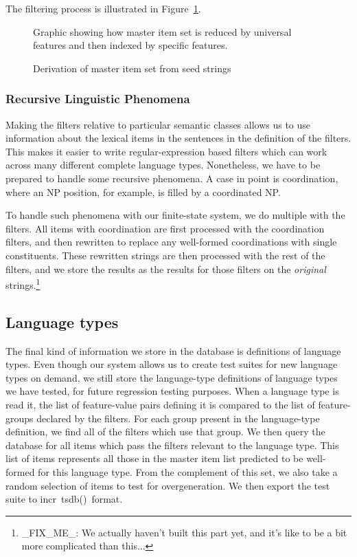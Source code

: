 \documentclass[11pt]{article}
\newcommand{\itsdb}{\mbox{\sf \lbrack incr tsdb()\rbrack}}
\begin{document}
The filtering process is illustrated in Figure~\ref{shrinking-sets}.

\begin{figure}[ht]
\begin{center}

Graphic showing how master item set is reduced by universal features
and then indexed by specific features.

\end{center}
\caption{Derivation of master item set from seed strings}
\label{shrinking-sets}
\end{figure}


\subsubsection{Recursive Linguistic Phenomena}

Making the filters relative to particular semantic classes
allows us to use information about the lexical items in 
the sentences in the definition of the filters.  This makes
it easier to write regular-expression based filters which
can work across many different complete language types. Nonetheless,
we have to be prepared to handle some recursive phenomena.
A case in point is coordination, where an NP position, for example,
is filled by a coordinated NP.  

To handle such phenomena with our finite-state system, we do multiple
with the filters.  All items with coordination are first processed
with the coordination filters, and then rewritten to replace any
well-formed coordinations with single constituents.  These rewritten
strings are then processed with the rest of the filters, and we store
the results as the results for those filters on the {\it original}
strings.\footnote{\_FIX\_ME\_: We actually haven't built this part yet,
and it's like to be a bit more complicated than this...}

\subsection{Language types}

The final kind of information we store in the database is definitions
of language types.  Even though our system allows us to create test
suites for new language types on demand, we still store the
language-type definitions of language types we have tested, for future
regression testing purposes.  When a language type is read it, the
list of feature-value pairs defining it is compared to the list of
feature-groups declared by the filters.  For each group present in the
language-type definition, we find all of the filters which use that
group.  We then query the database for all items which pass the
filters relevant to the language type.  This list of items represents
all those in the master item list predicted to be well-formed for
this language type.  From the complement of this set, we also take
a random selection of items to test for overgeneration.  We then export
the test suite to \itsdb\ format.
\end{document}
